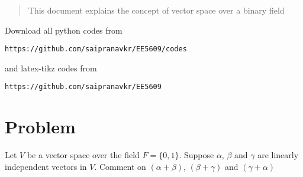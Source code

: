 \documentclass[journal,12pt,twocolumn]{IEEEtran}
\begin{document}
%
\begin{abstract}
This document explains the concept of vector space over a binary field
\end{abstract}
Download all python codes from 
%
\begin{lstlisting}
https://github.com/saipranavkr/EE5609/codes
\end{lstlisting}
%
and latex-tikz codes from 
%
\begin{lstlisting}
https://github.com/saipranavkr/EE5609
\end{lstlisting}
%
\renewcommand{\theenumi}{\roman{enumi}}%
\section{Problem}
Let $V$ be a vector space over the field $F = \{0,1\}$. Suppose $\alpha$, $\beta$ and $\gamma$ are linearly independent vectors in $V$. Comment on $(\alpha + \beta)$, $(\beta + \gamma)$ and $(\gamma + \alpha)$
%
%
\end{document}
